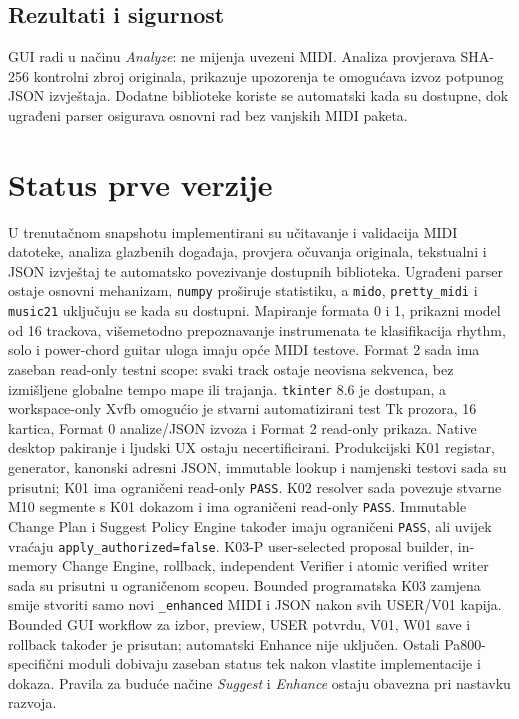 \documentclass[11pt]{article}
\begin{document}
\subsection{Rezultati i sigurnost}

GUI radi u načinu \emph{Analyze}: ne mijenja uvezeni MIDI. Analiza provjerava
SHA-256 kontrolni zbroj originala, prikazuje upozorenja te omogućava izvoz
potpunog JSON izvještaja. Dodatne biblioteke koriste se automatski kada su
dostupne, dok ugrađeni parser osigurava osnovni rad bez vanjskih MIDI paketa.

\section{Status prve verzije}

U trenutačnom snapshotu implementirani su učitavanje i validacija MIDI
datoteke, analiza glazbenih događaja, provjera očuvanja originala, tekstualni i
JSON izvještaj te automatsko povezivanje dostupnih biblioteka. Ugrađeni parser
ostaje osnovni mehanizam, \texttt{numpy} proširuje statistiku, a
\texttt{mido}, \texttt{pretty\_midi} i \texttt{music21} uključuju se kada su
dostupni. Mapiranje formata 0 i 1, prikazni model od 16 trackova, višemetodno
prepoznavanje instrumenata te klasifikacija rhythm, solo i power-chord guitar
uloga imaju opće MIDI testove. Format 2 sada ima zaseban read-only testni scope:
svaki track ostaje neovisna sekvenca, bez izmišljene globalne tempo mape ili
trajanja. \texttt{tkinter} 8.6 je dostupan, a workspace-only Xvfb omogućio je
stvarni automatizirani test Tk prozora, 16 kartica, Format 0 analize/JSON izvoza
i Format 2 read-only prikaza. Native desktop pakiranje i ljudski UX ostaju
necertificirani. Produkcijski K01 registar, generator, kanonski adresni JSON,
immutable lookup i namjenski testovi sada su prisutni; K01 ima ograničeni
read-only \texttt{PASS}. K02 resolver sada povezuje stvarne M10 segmente s K01
dokazom i ima ograničeni read-only \texttt{PASS}. Immutable Change Plan i
Suggest Policy Engine također imaju ograničeni \texttt{PASS}, ali uvijek vraćaju
\texttt{apply\_authorized=false}. K03-P user-selected proposal builder,
in-memory Change Engine, rollback, independent Verifier i atomic verified
writer sada su prisutni u ograničenom scopeu. Bounded programatska K03 zamjena
smije stvoriti samo novi \texttt{\_enhanced} MIDI i JSON nakon svih USER/V01 kapija.
Bounded GUI workflow za izbor, preview, USER potvrdu, V01, W01 save i rollback
također je prisutan; automatski Enhance nije uključen. Ostali
Pa800-specifični moduli dobivaju zaseban status tek nakon vlastite
implementacije i dokaza. Pravila za buduće načine \emph{Suggest} i
\emph{Enhance} ostaju obavezna pri nastavku razvoja.
\end{document}

